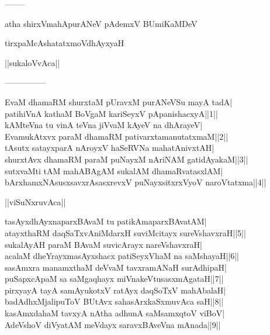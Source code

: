 \documentclass{article}
\begin{document}
\begin{center}
--------
\end{center}

\begin{center}
atha shirxVmahApurANeV pAdemxV BUmiKaMDeV
\end{center}

\begin{center}
tirxpaMcAshatatxmoVdhAyxyaH
\end{center}

\begin{center}
||sukaloVvAca||
\end{center}

\begin{center}
---------------
\end{center}

EvaM dhamaRM shurxtaM pUravxM purANeVSu mayA tadA|\\
patihiVnA kathaM BoVgaM kariSeyxV pApanishacxyA||1||\\
kAMteVna tu vinA teVna jiVvaM kAyeV na dhArayeV|\\
EvamukAtxvx paraM dhamaRM pativarxtamanutatxmaM||2||\\
tAsutx satayxparA nAroyxV haSeRVNa mahatAnivxtAH|\\
shurxtAvx dhamaRM paraM puNayxM nAriNAM gatidAyakaM||3||\\
sutxvaMti tAM mahABAgAM sukalAM dhamaRvatasxlAM|\\
bArxhamxNAsusxsavxrAsasxrevxV puNayxsitxrxVyoV naroVtatxma||4||\\

\begin{center}
||viSuNxruvAca||
\end{center}


tasAyxdhAyxnaparxBAvaM tu patikAmaparxBAvatAM|\\
atayxthaRM daqSaTxvAniMdarxH suviMcitayx sureVshavxraH||5||\\
sukalAyAH paraM BAvaM suvicArayx nareVshavxraH|\\
acalaM dheYrayxmasAyxshacx patiSeyxVhaM na saMshayaH||6||\\
sasAmxra manamxthaM deVvaM tavxramANaH surAdhipaH|\\
puSapxcApaM sa saMgaqhayx miVnakeVtusasxmAgataH||7||\\
pirxyayA tayA samAyukotxV ratAyx daqSoTxV mahAbalaH|\\
badAdhxMjalipuToV BUtAvx sahasArxkaSxmuvAca saH||8||\\
kasAmxdahaM tavxyA nAtha adhunA saMsamxqtoV viBoV|\\
AdeVshoV diVyatAM meVdayx saravxBAveVna mAnada||9||\\
\end{document}
